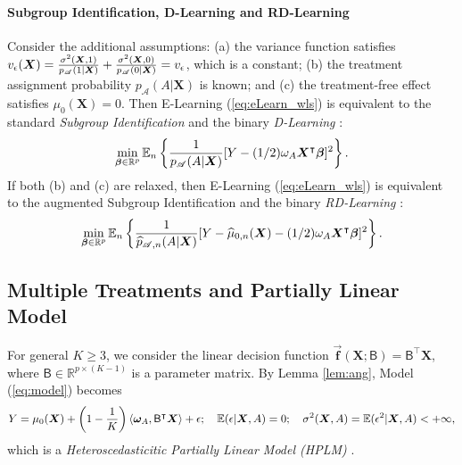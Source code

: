 \documentclass[11pt]{article}
\theoremstyle{definition}
\theoremstyle{remark}
\newcommand{\bbf}{\bm{f}}
\newcommand{\bX}{\bm{X}}
\newcommand{\bbeta}{\bm{\beta}}
\newcommand{\bomega}{\bm{\omega}}
\newcommand{\bbE}{\mathbb{E}}
\newcommand{\bbR}{\mathbb{R}}
\newcommand{\sA}{\mathscr{A}}
\newcommand{\sfB}{\mathsf{B}}
\begin{document}
\paragraph{Subgroup Identification, D-Learning and RD-Learning}

Consider the additional assumptions: (a) the variance function satisfies $ v_{\epsilon}(\bX) = {\sigma^{2}(\bX,1) \over p_{\sA}(1|\bX)} + {\sigma^{2}(\bX,0) \over p_{\sA}(0|\bX)} = v_{\epsilon} $, which is a constant; (b) the treatment assignment probability $ p_{\sA}(A|\bX) $ is known; and (c) the treatment-free effect satisfies $ \mu_{0}(\bX) = 0 $. Then E-Learning (\ref{eq:eLearn_wls}) is equivalent to the standard \textit{Subgroup Identification} \citep{tian2014simple,chen2017general} and the binary \textit{D-Learning} \citep{qi2018d}:
\[ \min_{\bbeta \in \bbR^{p}}\bbE_{n}\left\{ {1 \over p_{\sA}(A|\bX)}[Y - (1/2)\omega_{A}\bX^{\intercal}\bbeta]^{2} \right\}. \]
If both (b) and (c) are relaxed, then E-Learning (\ref{eq:eLearn_wls}) is equivalent to the augmented Subgroup Identification \citep[Web Appendix B]{chen2017general} and the binary \textit{RD-Learning} \citep{meng2020robust}:
\[ \min_{\bbeta \in \bbR^{p}}\bbE_{n}\left\{ {1 \over \widehat{p}_{\sA,n}(A|\bX)}[Y - \widehat{\mu}_{0,n}(\bX) - (1/2)\omega_{A}\bX^{\intercal}\bbeta]^{2} \right\}. \]

\subsection{Multiple Treatments and Partially Linear Model}\label{sec:multiple}

For general $ K \ge 3 $, we consider the linear decision function $ \vec{\bbf}(\bX;\sfB) = \sfB^{\intercal}\bX $, where $ \sfB \in \bbR^{p \times (K-1)} $ is a parameter matrix. By Lemma \ref{lem:ang}, Model (\ref{eq:model}) becomes
\begin{align}
	Y = \mu_{0}(\bX) + \left( 1 - {1 \over K} \right)\langle \bomega_{A}, \sfB^{\intercal}\bX \rangle + \epsilon; \quad \bbE(\epsilon|\bX,A) = 0; \quad \sigma^{2}(\bX,A) = \bbE(\epsilon^{2}|\bX,A) < +\infty,\label{eq:plm}
\end{align}
which is a \textit{Heteroscedasticitic Partially Linear Model (HPLM)} \citep{ma2006efficient}.
\end{document}
